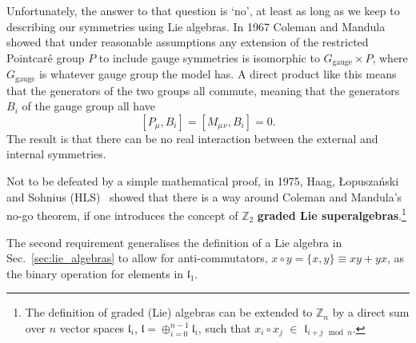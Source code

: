 \documentclass[notes.tex]{subfiles}
\begin{document}
Unfortunately, the answer to that question is `no', at least as long as we keep to describing our symmetries using Lie algebras. In 1967 Coleman and Mandula~\cite{Coleman:1967ad} showed that under reasonable assumptions any extension of the restricted Pointcaré group $P$ to include gauge symmetries is isomorphic to $G_\text{gauge}\times P$, where $G_\text{gauge}$ is whatever gauge group the model has. A direct product like this means that the generators of the two groups all commute, meaning that the generators $B_i$ of the gauge group all have
\[[P_\mu, B_i] = [M_\mu{}_\nu, B_i] = 0.\]
The result is that there can be no real interaction between the external and internal symmetries.

Not to be defeated by a simple mathematical proof, in 1975, Haag, \L opusza\'{n}ski and Sohnius (HLS)~\cite{Haag:1974qh} showed that there is a way around Coleman and Mandula's no-go theorem, if one introduces the concept of $\mathbb{Z}_2$ {\bf graded Lie superalgebras}.\footnote{The definition of graded (Lie) algebras can be extended to $\mathbb{Z}_n$ by a direct sum over $n$ vector spaces $\mathfrak l_i$, $\mathfrak l = \oplus_{i=0}^{n-1} \mathfrak l_i$, such that $x_i\circ x_j$ $\in$ $\mathfrak l_{i+j\mod{n}}$.}

The second requirement  generalises the definition of a Lie algebra in Sec.~\ref{sec:lie_algebras} to allow for anti-commutators, $x\circ y = \{x,y\}\equiv xy+yx$, as the binary operation for elements in  $\mathfrak l_1$. 
\end{document}
